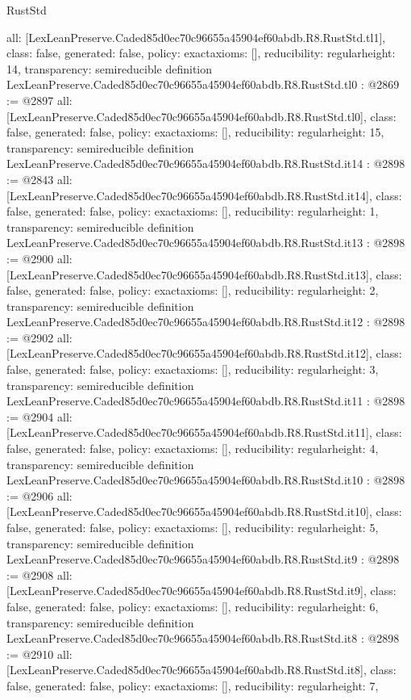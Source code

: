 \begin{lexlean}{RustStd}
\begin{coremodule}
{  all: [LexLeanPreserve.Caded85d0ec70c96655a45904ef60abdb.R8.RustStd.tl1],
  class: false,
  generated: false,
  policy: exact{axioms: []},
  reducibility: regular{height: 14},
  transparency: semireducible
}
definition LexLeanPreserve.Caded85d0ec70c96655a45904ef60abdb.R8.RustStd.tl0 : @2869 := @2897 {
  all: [LexLeanPreserve.Caded85d0ec70c96655a45904ef60abdb.R8.RustStd.tl0],
  class: false,
  generated: false,
  policy: exact{axioms: []},
  reducibility: regular{height: 15},
  transparency: semireducible
}
definition LexLeanPreserve.Caded85d0ec70c96655a45904ef60abdb.R8.RustStd.it14 : @2898 := @2843 {
  all: [LexLeanPreserve.Caded85d0ec70c96655a45904ef60abdb.R8.RustStd.it14],
  class: false,
  generated: false,
  policy: exact{axioms: []},
  reducibility: regular{height: 1},
  transparency: semireducible
}
definition LexLeanPreserve.Caded85d0ec70c96655a45904ef60abdb.R8.RustStd.it13 : @2898 := @2900 {
  all: [LexLeanPreserve.Caded85d0ec70c96655a45904ef60abdb.R8.RustStd.it13],
  class: false,
  generated: false,
  policy: exact{axioms: []},
  reducibility: regular{height: 2},
  transparency: semireducible
}
definition LexLeanPreserve.Caded85d0ec70c96655a45904ef60abdb.R8.RustStd.it12 : @2898 := @2902 {
  all: [LexLeanPreserve.Caded85d0ec70c96655a45904ef60abdb.R8.RustStd.it12],
  class: false,
  generated: false,
  policy: exact{axioms: []},
  reducibility: regular{height: 3},
  transparency: semireducible
}
definition LexLeanPreserve.Caded85d0ec70c96655a45904ef60abdb.R8.RustStd.it11 : @2898 := @2904 {
  all: [LexLeanPreserve.Caded85d0ec70c96655a45904ef60abdb.R8.RustStd.it11],
  class: false,
  generated: false,
  policy: exact{axioms: []},
  reducibility: regular{height: 4},
  transparency: semireducible
}
definition LexLeanPreserve.Caded85d0ec70c96655a45904ef60abdb.R8.RustStd.it10 : @2898 := @2906 {
  all: [LexLeanPreserve.Caded85d0ec70c96655a45904ef60abdb.R8.RustStd.it10],
  class: false,
  generated: false,
  policy: exact{axioms: []},
  reducibility: regular{height: 5},
  transparency: semireducible
}
definition LexLeanPreserve.Caded85d0ec70c96655a45904ef60abdb.R8.RustStd.it9 : @2898 := @2908 {
  all: [LexLeanPreserve.Caded85d0ec70c96655a45904ef60abdb.R8.RustStd.it9],
  class: false,
  generated: false,
  policy: exact{axioms: []},
  reducibility: regular{height: 6},
  transparency: semireducible
}
definition LexLeanPreserve.Caded85d0ec70c96655a45904ef60abdb.R8.RustStd.it8 : @2898 := @2910 {
  all: [LexLeanPreserve.Caded85d0ec70c96655a45904ef60abdb.R8.RustStd.it8],
  class: false,
  generated: false,
  policy: exact{axioms: []},
  reducibility: regular{height: 7},
}
\end{coremodule}
\end{lexlean}
